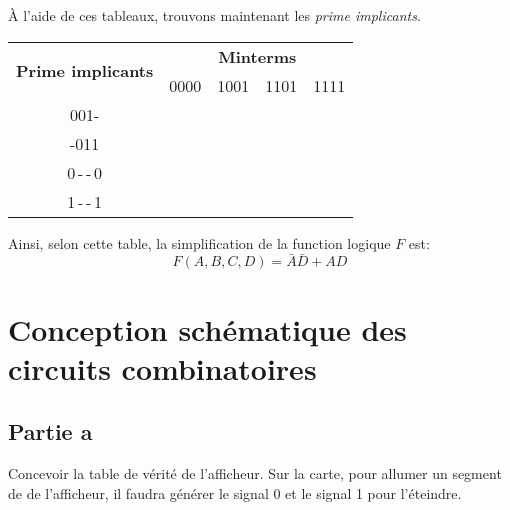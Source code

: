 \documentclass[12pt]{article}
\begin{document}
\noindent
À l'aide de ces tableaux, trouvons maintenant les \textsl{prime implicants}.

\vspace*{-24pt}\singlespacing\noindent
\begin{center}
	\begin{tabular}[t]{|c|c|c|c|c|}
		\hline
		\multirow{2}{*}{\textbf{Prime implicants}} & \multicolumn{4}{c}{\textbf{Minterms}}\vline                                        \\
		\cline{2-5}
		                                           & 0000                                        & 1001       & 1101       & 1111       \\
		\hline
		001-                                       &                                             &            &            &            \\
		\hline
		-011                                       &                                             &            &            &            \\
		\hline
		0\,-\,-\,0                                 & \checkmark                                  &            &            &            \\
		\hline
		1\,-\,-\,1                                 &                                             & \checkmark & \checkmark & \checkmark \\
		\hline
	\end{tabular}
\end{center}
\doublespacing

\noindent
Ainsi, selon cette table, la simplification de la function logique $F$ est:
\vspace*{-12pt}
\begin{equation}
	F(A,B,C,D)=\bar{A}\bar{D}+ AD
\end{equation}

\pagebreak
\section{Conception schématique des circuits combinatoires}
\subsection{Partie a}
Concevoir la table de vérité de l'afficheur. Sur la carte, pour allumer un segment de de l'afficheur, il faudra générer
le signal 0 et le signal 1 pour l'éteindre.
\end{document}
